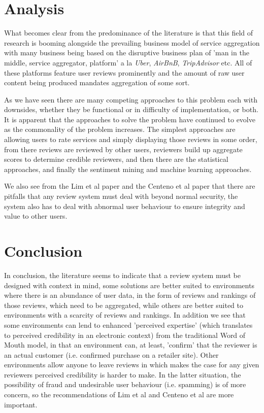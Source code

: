 \section{Analysis}
What becomes clear from the predominance of the literature is that this field of research is booming alongside the prevailing business model of service aggregation with many business being based on the disruptive business plan of 'man in the middle, service aggregator, platform' a la \emph{Uber}, \emph{AirBnB}, \emph{TripAdvisor} etc. All of these platforms feature user reviews prominently and the amount of raw user content being produced mandates aggregation of some sort. 

As we have seen there are many competing approaches to this problem each with downsides, whether they be functional or in difficulty of implementation, or both. It is apparent that the approaches to solve the problem have continued to evolve as the commonality of the problem increases. The simplest approaches are allowing users to rate services and simply displaying those reviews in some order, from there reviews are reviewed by other users, reviewers build up aggregate scores to determine credible reviewers, and then there are the statistical approaches, and finally the sentiment mining and machine learning approaches.

We also see from the Lim et al paper\cite{Lim} and the Centeno et al\cite{Centeno} paper that there are pitfalls that any review system must deal with beyond normal security, the system also has to deal with abnormal user behaviour to ensure integrity and value to other users.

\section{Conclusion}
In conclusion, the literature seems to indicate that a review system must be designed with context in mind, some solutions are better suited to environments where there is an abundance of user data, in the form of reviews and rankings of those reviews, which need to be aggregated, while others are better suited to environments with a scarcity of reviews and rankings. In addition we see that some environments can lend to enhanced 'perceived expertise' (which translates to perceived credibility in an electronic context) from the traditional Word of Mouth model, in that an environment can, at least, 'confirm' that the reviewer is an actual customer (i.e. confirmed purchase on a retailer site). Other environments allow anyone to leave reviews in which makes the case for any given reviewers perceived credibility is harder to make. In the latter situation, the possibility of fraud and undesirable user behaviour (i.e. spamming) is of more concern, so the recommendations of \cite{Lim}Lim et al and \cite{Centeno}Centeno et al are more important.

